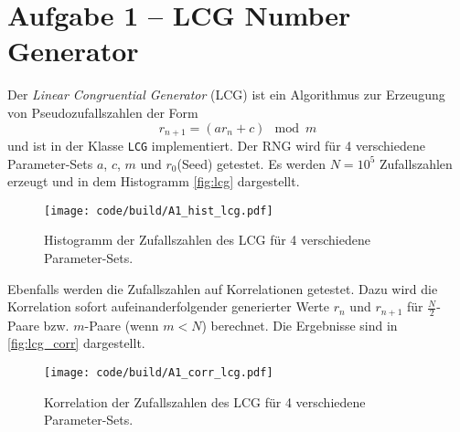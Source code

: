 \section{Aufgabe 1 – LCG Number Generator}
\label{sec:A1}

Der \emph{Linear Congruential Generator} (LCG) ist ein Algorithmus zur Erzeugung von Pseudozufallszahlen der Form
\begin{equation}
  \label{eq:lcg}
  r_{n+1} = (a r_n + c) \mod m
\end{equation}
und ist in der Klasse \texttt{LCG} implementiert.
Der RNG wird für 4 verschiedene Parameter-Sets $a$, $c$, $m$ und $r_0$(Seed) getestet.
Es werden $N = 10^5$ Zufallszahlen erzeugt und in dem Histogramm \autoref{fig:lcg} dargestellt.
\begin{figure}
    \centering
    \texttt{[image: code/build/A1\_hist\_lcg.pdf]}
    \caption{Histogramm der Zufallszahlen des LCG für 4 verschiedene Parameter-Sets.}
    \label{fig:lcg}
\end{figure}

Ebenfalls werden die Zufallszahlen auf Korrelationen getestet.
Dazu wird die Korrelation sofort aufeinanderfolgender generierter Werte $r_n$ und $r_{n+1}$ für $\frac{N}{2}$-Paare bzw. $m$-Paare (wenn $m<N$) berechnet.
Die Ergebnisse sind in \autoref{fig:lcg_corr} dargestellt.
\begin{figure}
    \centering
    \texttt{[image: code/build/A1\_corr\_lcg.pdf]}
    \caption{Korrelation der Zufallszahlen des LCG für 4 verschiedene Parameter-Sets.}
    \label{fig:lcg_corr}
\end{figure}